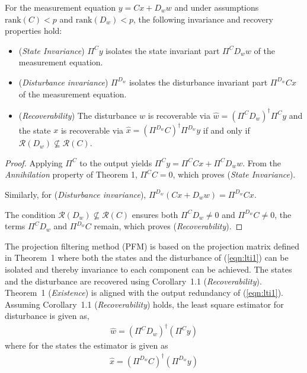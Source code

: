 \begin{corollary}
For the measurement equation $y = Cx + D_w w$ and under assumptions $\mathrm{rank}(C) < p$ and $\mathrm{rank}(D_w) < p$, the following invariance and recovery properties hold:
\begin{itemize}
    \item (\textit{State Invariance}) $\Pi^C y$ isolates the state invariant part $\Pi^C D_w w$ of the measurement equation. 
    \item (\textit{Disturbance invariance}) $\Pi^{D_w}$ isolates the disturbance invariant part $\Pi^{D_w} C x$ of the measurement equation.
    \item (\textit{Recoverability}) The disturbance $w$ is recoverable via $\hat{w} = (\Pi^C D_w)^\dagger \Pi^C y$ and the state $x$ is recoverable via $\hat{x} = (\Pi^{D_w}C)^\dagger \Pi^{D_w} y$ if and only if $\mathcal{R}(D_w) \not\subseteq \mathcal{R}(C)$.
\end{itemize}
\end{corollary}

\begin{proof}
    Applying $\Pi^C$ to the output yields $\Pi^C y = \Pi^C Cx + \Pi^C D_w w$. From the \textit{Annihilation} property of Theorem 1, $\Pi^C C = 0$, which proves (\textit{State Invariance}). 
    
    Similarly, for (\textit{Disturbance invariance}), $\Pi^{D_w} (Cx + D_w w)=\Pi^{D_w} Cx$.
    
    The condition $\mathcal{R}(D_w) \not\subseteq \mathcal{R}(C)$ ensures both $\Pi^C D_w \neq 0$ and $\Pi^{D_w}C\neq 0$, the terms $\Pi^C D_w$ and $\Pi^{D_w} C$ remain, which proves (\textit{Recoverability}).
\end{proof}


The projection filtering method (PFM) is based on the projection matrix defined in Theorem~1 where both the states and the disturbance of (\ref{eqn:lti1}) can be isolated and thereby invariance to each component can be achieved. The states and the disturbance are recovered using Corollary~1.1 (\textit{Recoverability}). Theorem~1 (\textit{Existence}) is aligned with the output redundancy of (\ref{eqn:lti1}). Assuming Corollary~1.1 (\textit{Recoverability}) holds, the least square estimator for disturbance is given as,
\begin{gather}
    \hat{w}=(\Pi^C D_w)^\dagger(\Pi^C y)\label{eqn:filtering_w}
\end{gather}
where for the states the estimator is given as
\begin{gather}
    \hat{x}=(\Pi^{D_w}C)^\dagger(\Pi^{D_w} y)\label{eqn:filtering_x}
\end{gather}


